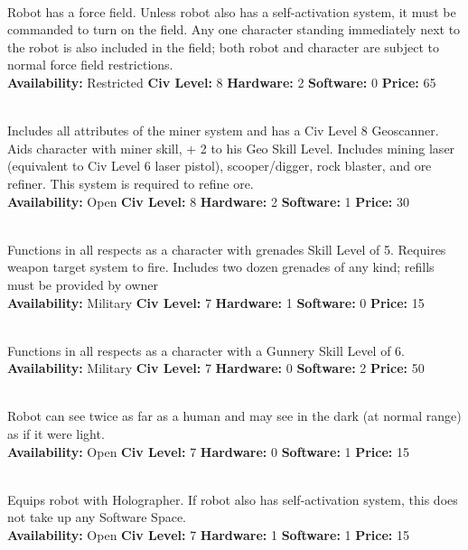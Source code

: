 \\ 
Robot has a force field. Unless robot also has a self-activation
system, it must be commanded to turn on the field. Any one character  
standing immediately next to the robot is also included in the field;
both robot and character are subject to normal force field  
restrictions. 
\\
\textbf{Availability:} Restricted \textbf{Civ Level:} 8
\textbf{Hardware:} 2 \textbf{Software:} 0
\textbf{Price:} 65  

\\
Includes all attributes of the miner system and has a Civ Level 8 Geoscanner. Aids character with miner skill, + 2 to his Geo Skill Level. 
Includes mining laser (equivalent to Civ Level 6 laser pistol), scooper/digger, rock blaster, and ore refiner. This system is required to 
refine ore. 
\\
\textbf{Availability:} Open \textbf{Civ Level:} 8 \textbf{Hardware:} 2 \textbf{Software:} 1 \textbf{Price:} 30 

\\
Functions in all respects as a character with grenades Skill Level of 5. Requires weapon target system to fire. Includes two dozen 
grenades of any kind; refills must be provided by owner 
\\
\textbf{Availability:} Military \textbf{Civ Level:} 7 \textbf{Hardware:} 1 \textbf{Software:} 0 \textbf{Price:} 15 

\\
Functions in all respects as a character with a Gunnery Skill Level of 6. 
\\
\textbf{Availability:} Military \textbf{Civ Level:} 7 \textbf{Hardware:} 0 \textbf{Software:} 2 \textbf{Price:} 50 

\\
Robot can see twice as far as a human and may see in the dark (at normal range) as if it were light. 
\\
\textbf{Availability:} Open \textbf{Civ Level:} 7 \textbf{Hardware:} 0 \textbf{Software:} 1 \textbf{Price:} 15 

\\
Equips robot with Holographer. If robot also has self-activation system, this does not take up any Software Space. 
\\
\textbf{Availability:} Open \textbf{Civ Level:} 7 \textbf{Hardware:} 1 \textbf{Software:} 1 \textbf{Price:} 15 


